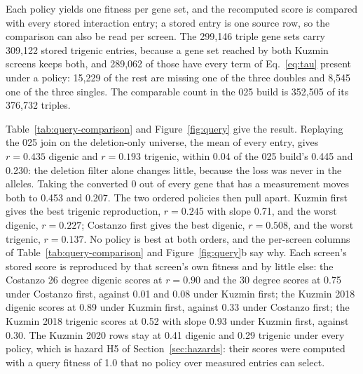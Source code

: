 Each policy yields one fitness per gene set, and the recomputed score is compared with
every stored interaction entry; a stored entry is one source row, so the comparison
can also be read per screen. The 299{,}146 triple gene sets carry 309{,}122 stored
trigenic entries, because a gene set reached by both Kuzmin screens keeps both, and
289{,}062 of those have every term of Eq.~\ref{eq:tau} present under a policy:
15{,}229 of the rest are missing one of the three doubles and 8{,}545 one of the three
singles. The comparable count in the 025 build is 352{,}505 of its 376{,}732 triples.

\begin{table}[H]
\centering
\footnotesize
\caption{Composition of the two builds and survival of the pinned splits. The 010
pinned triples are the validation and test sets of every random-split arm; a pinned
triple absent from 029 was measured only with a temperature-sensitive array allele or
a non-deletion query. Generated by \texttt{closure\_recompute.py}.}
\label{tab:survival}

\end{table}

Table~\ref{tab:query-comparison} and Figure~\ref{fig:query} give the result.
Replaying the 025 join on the deletion-only universe, the mean of every entry, gives
$r = 0.435$ digenic and $r = 0.193$ trigenic, within 0.04 of the 025 build's 0.445
and 0.230: the deletion filter alone changes little, because the loss was never in the
alleles. Taking the converted 0 out of every gene that has a measurement moves both
to 0.453 and 0.207. The two ordered policies then pull apart. Kuzmin first gives the
best trigenic reproduction, $r = 0.245$ with slope 0.71, and the worst digenic,
$r = 0.227$; Costanzo first gives the best digenic, $r = 0.508$, and the worst
trigenic, $r = 0.137$. No policy is best at both orders, and the per-screen columns of
Table~\ref{tab:query-comparison} and Figure~\ref{fig:query}b say why. Each screen's
stored score is reproduced by that screen's own fitness and by little else: the
Costanzo 26 degree digenic scores at $r = 0.90$ and the 30 degree scores at 0.75 under
Costanzo first, against 0.01 and 0.08 under Kuzmin first; the Kuzmin 2018 digenic
scores at 0.89 under Kuzmin first, against 0.33 under Costanzo first; the Kuzmin 2018
trigenic scores at 0.52 with slope 0.93 under Kuzmin first, against 0.30. The Kuzmin
2020 rows stay at 0.41 digenic and 0.29 trigenic under every policy, which is hazard
H5 of Section~\ref{sec:hazards}: their scores were computed with a query fitness of
1.0 that no policy over measured entries can select.

